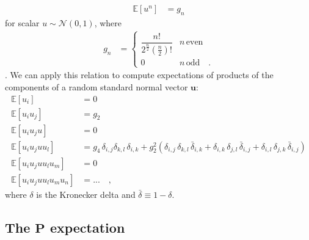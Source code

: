 %
\begin{align}
    \mathbb{E}\left[ u^n \right] & = g_n
\end{align}
%
for scalar $u \sim \mathcal{N}(0, 1)$, where
%
\begin{align}
    g_n
     & =
    \begin{cases}
        \dfrac{n!}{2^\frac{n}{2} \left(\frac{n}{2}\right)!} & n \, \mathrm{even}
        \\
        0                                                   & n \, \mathrm{odd}
        \quad.
    \end{cases}
\end{align}
%
\citep[e.g.,][]{Winkelbauer2012}.
We can apply this relation to compute expectations
of products of the components of a random standard normal vector $\mathbf{u}$:
%
\begin{align}
    \mathbb{E}\left[u_i \right]                  & = 0
    \\[1em]
    \mathbb{E}\left[u_i u_j\right]               & = g_2
    \\[1em]
    \mathbb{E}\left[u_i u_j u\right]             & = 0
    \\[1em]
    \mathbb{E}\left[u_i u_j u u_l\right]         & =
    g_4 \, \delta_{i, j} \delta_{k, l} \, \delta_{i, k}
    +
    g_2^2 \left(
    \delta_{i, j} \, \delta_{k, l} \, \bar{\delta}_{i, k}
    +
    \delta_{i, k} \, \delta_{j, l} \, \bar{\delta}_{i, j}
    +
    \delta_{i, l} \, \delta_{j, k} \, \bar{\delta}_{i, j}
    \right)
    \\[1em]
    \mathbb{E}\left[u_i u_j u u_l u_m\right]     & = 0
    \\[1em]
    \mathbb{E}\left[u_i u_j u u_l u_m u_n\right] & =
    ...
    \quad,
\end{align}
%
where $\delta$ is the Kronecker delta and $\bar{\delta} \equiv 1 - \delta$.

\subsection{The $\mathbf{P}$ expectation}

